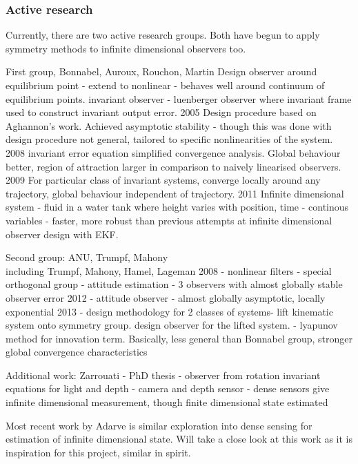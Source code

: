 \subsubsection{Active research}
Currently, there are two active research groups. Both have begun to apply symmetry methods to infinite dimensional observers too.

First group, Bonnabel, Auroux, Rouchon, Martin
Design observer around equilibrium point - extend to nonlinear - behaves well around continuum of equilibrium points. 
invariant observer - luenberger observer where invariant frame used to construct invariant output error.
2005 \cite{bonnabel2005invariant} Design procedure based on Aghannon's work. Achieved asymptotic stability - though this was done with design procedure not general, tailored to specific nonlinearities of the system.
2008 \cite{bonnabel2008symmetry} invariant error equation simplified convergence analysis. Global behaviour better, region of attraction larger in comparison to naively linearised observers.
2009 \cite{bonnabel2009non} For particular class of invariant systems, converge locally around any trajectory, global behaviour independent of trajectory.
2011 \cite{auroux2011symmetry} Infinite dimensional system - fluid in a water tank where height varies with position, time - continous variables - faster, more robust than previous attempts at infinite dimensional observer design with EKF.

Second group: ANU, Trumpf, Mahony\\
including Trumpf, Mahony, Hamel, Lageman
2008 \cite{mahony2009nonlinear} - nonlinear filters - special orthogonal group - attitude estimation - 3 observers with almost globally stable observer error
2012 \cite{trumpf2012analysis} - attitude observer - almost globally asymptotic, locally exponential
2013 \cite{mahony2013observers} - design methodology for 2 classes of systems- lift kinematic system onto symmetry group. design observer for the lifted system. - lyapunov method for innovation term. Basically, less general than Bonnabel group, stronger global convergence characteristics

Additional work:
Zarrouati \cite{zarrouati2013augmented} - PhD thesis - observer from rotation invariant equations for light and depth - camera and depth sensor - dense sensors give infinite dimensional measurement, though finite dimensional state estimated

Most recent work by Adarve \cite{adarvefiltering} is similar exploration into dense sensing for estimation of infinite dimensional state. Will take a close look at this work as it is inspiration for this project, similar in spirit.

